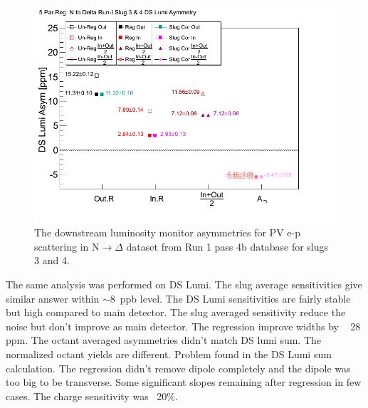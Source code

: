 \begin{singlespace}
\begin{figure}[!h]
	\begin{center}
	\includegraphics[width=15.0cm]{figures/n2DeltaDSLumiSummaryPlotReg5}
	\end{center}
	\caption
	{The downstream luminosity monitor asymmetries for PV e-p scattering in N$\rightarrow\Delta$ dataset from Run 1 pass 4b database for slugs 3 and 4.}
	\label{fig:n2DeltaDSLumiSummaryPlotReg5}
\end{figure}
\end{singlespace}



The same analysis was performed on DS Lumi. 
The slug average sensitivities give similar answer within $\sim$8~ppb level. 
The DS Lumi sensitivities are fairly stable but high compared to main detector. 
The  slug averaged sensitivity reduce the noise but don't improve as main detector. 
The regression improve widths by ~ 28 ppm. 
The octant averaged asymmetries didn't match DS lumi sum. 
The normalized octant yields are different. Problem found in the DS Lumi sum calculation. 
The regression didn't remove dipole completely and the dipole was too big to be transverse. 
Some significant slopes remaining after regression in few cases. 
The charge sensitivity was ~20\%. 

